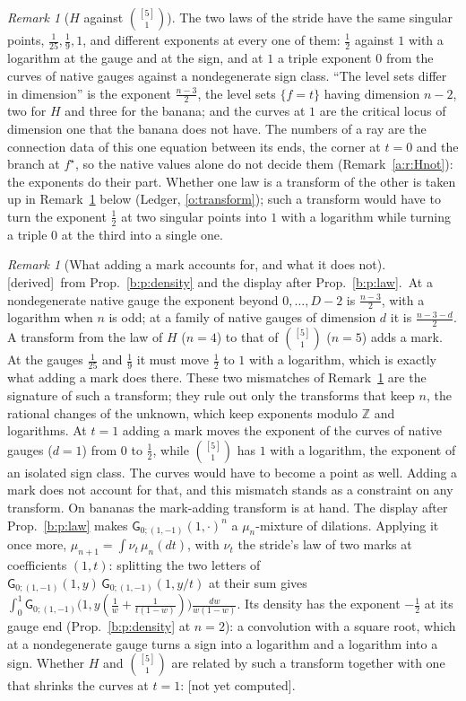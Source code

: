 \documentclass[11pt]{article}
\newcommand{\sG}{\mathsf G}
\theoremstyle{plain}
\theoremstyle{definition}
\theoremstyle{remark}
\newtheorem{remark}[proposition]{Remark}
\newcommand{\derived}{\textup{[derived]}}
\newcommand{\notyet}{\textup{[not yet computed]}}
\begin{document}
\begin{remark}[$H$ against $\binom{[5]}1$]\label{b:r:Hfive}
The two laws of the stride have the same singular points, $\frac1{25},\frac19,1$, and different exponents at every one of them: $\frac12$ against $1$ with a logarithm at the gauge and at the sign, and at $1$ a triple exponent $0$ from the curves of native gauges against a nondegenerate sign class. ``The level sets differ in dimension'' is the exponent $\frac{n-3}2$, the level sets $\{f=t\}$ having dimension $n-2$, two for $H$ and three for the banana; and the curves at $1$ are the critical locus of dimension one that the banana does not have. The numbers of a ray are the connection data of this one equation between its ends, the corner at $t=0$ and the branch at $f^\star$, so the native values alone do not decide them (Remark~\ref{a:r:Hnot}): the exponents do their part. Whether one law is a transform of the other is taken up in Remark~\ref{c:r:transform} below (Ledger, \ref{o:transform}); such a transform would have to turn the exponent $\frac12$ at two singular points into $1$ with a logarithm while turning a triple $0$ at the third into a single one.
\end{remark}

\begin{remark}[What adding a mark accounts for, and what it does not]\label{c:r:transform}\derived\ from Prop.~\ref{b:p:density} and the display after Prop.~\ref{b:p:law}.\
At a nondegenerate native gauge the exponent beyond $0,\dots,D-2$ is $\frac{n-3}2$, with a logarithm when $n$ is odd; at a family of native gauges of dimension $d$ it is $\frac{n-3-d}2$. A transform from the law of $H$ ($n=4$) to that of $\binom{[5]}1$ ($n=5$) adds a mark. At the gauges $\frac1{25}$ and $\frac19$ it must move $\frac12$ to $1$ with a logarithm, which is exactly what adding a mark does there. These two mismatches of Remark~\ref{b:r:Hfive} are the signature of such a transform; they rule out only the transforms that keep $n$, the rational changes of the unknown, which keep exponents modulo $\mathbb Z$ and logarithms. At $t=1$ adding a mark moves the exponent of the curves of native gauges ($d=1$) from $0$ to $\frac12$, while $\binom{[5]}1$ has $1$ with a logarithm, the exponent of an isolated sign class. The curves would have to become a point as well. Adding a mark does not account for that, and this mismatch stands as a constraint on any transform. On bananas the mark-adding transform is at hand. The display after Prop.~\ref{b:p:law} makes $\sG_{0;(1,-1)}(1,\cdot)^{n}$ a $\mu_n$-mixture of dilations. Applying it once more, $\mu_{n+1}=\int\nu_t\,\mu_n(dt)$, with $\nu_t$ the stride's law of two marks at coefficients $(1,t)$: splitting the two letters of $\sG_{0;(1,-1)}(1,y)\,\sG_{0;(1,-1)}(1,y/t)$ at their sum gives $\int_0^1\sG_{0;(1,-1)}\big(1,y(\frac1w+\frac1{t(1-w)})\big)\frac{dw}{w(1-w)}$. Its density has the exponent $-\frac12$ at its gauge end (Prop.~\ref{b:p:density} at $n=2$): a convolution with a square root, which at a nondegenerate gauge turns a sign into a logarithm and a logarithm into a sign. Whether $H$ and $\binom{[5]}1$ are related by such a transform together with one that shrinks the curves at $t=1$: \notyet.
\end{remark}
\end{document}
